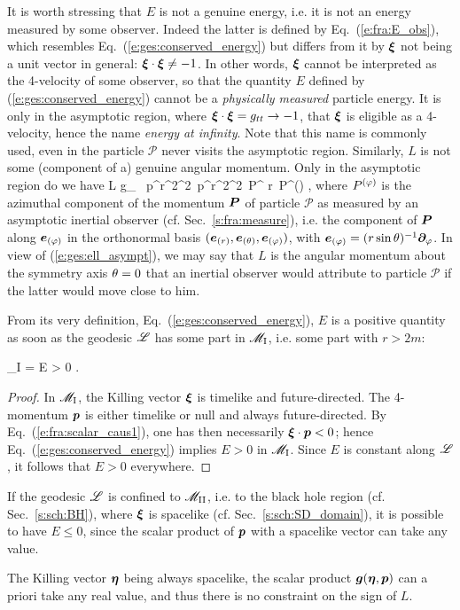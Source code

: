 It is worth stressing that $E$ is not a genuine energy, i.e. it is not
an energy measured by some observer. Indeed the latter is defined by
Eq.~(\ref{e:fra:E_obs}), which resembles Eq.~(\ref{e:ges:conserved_energy})
but differs from it by $\bm{\xi}$ not being a unit vector in general:
$\bm{\xi}\cdot\bm{\xi} \not = -1$. In other words, $\bm{\xi}$ cannot
be interpreted as the 4-velocity of some observer, so that the quantity
$E$ defined by (\ref{e:ges:conserved_energy}) cannot be a \emph{physically measured}
particle energy. It is only in the asymptotic region, where $\bm{\xi}\cdot\bm{\xi} = g_{tt}
\to -1$, that $\bm{\xi}$ is eligible as a 4-velocity, hence the name
\emph{energy at infinity}. Note that this name is commonly used, even in the
particle $\mathscr{P}$ never visits the asymptotic region.
Similarly, $L$ is not some (component of a) genuine angular momentum. Only in the
asymptotic region do we have
\be \label{e:ges:ell_asympt}
    L \simeq g_{\ph\ph} \, p^\ph \simeq r^2\sin^2\ph \, p^\ph \simeq r^2\sin^2\theta \, P^\ph
    \simeq r\sin\th \, P^{(\ph)} ,
\ee
where $P^{(\varphi)}$ is the azimuthal component of the momentum $\bm{P}$ of particle $\mathscr{P}$
as measured by an asymptotic inertial observer (cf. Sec.~\ref{s:fra:measure}), i.e.
the component of $\bm{P}$ along $\bm{e}_{(\varphi)}$ in the orthonormal basis $(\bm{e}_{(r)}, \bm{e}_{(\theta)}, \bm{e}_{(\varphi)})$, with $\bm{e}_{(\varphi)} = (r\sin\theta)^{-1} \bm{\partial}_\varphi$.
In view of (\ref{e:ges:ell_asympt}), we may say that $L$ is the angular momentum
about the symmetry axis $\theta=0$ that an inertial observer would attribute to
particle $\mathscr{P}$ if the latter would move close to him.

From its very definition, Eq.~(\ref{e:ges:conserved_energy}), $E$ is
a positive
quantity as soon as the geodesic $\mathscr{L}$ has some part in $\mathscr{M}_{\rm I}$, i.e.
some part with $r>2m$:
\begin{greybox}
\be \label{e:ges:E_positive_M_I}
    \Li \cap \M_{\rm I} \not= \varnothing \quad \Longrightarrow \quad E > 0 .
\ee
\end{greybox}
\begin{proof}
In $\mathscr{M}_{\rm I}$, the Killing vector $\bm{\xi}$ is timelike and future-directed.
The 4-momentum $\bm{p}$ is either timelike or null and always future-directed.
By Eq.~(\ref{e:fra:scalar_caus1}), one has then necessarily $\bm{\xi}\cdot\bm{p} < 0$; hence Eq.~(\ref{e:ges:conserved_energy})
implies $E > 0$ in $\mathscr{M}_{\rm I}$. Since $E$ is constant along $\mathscr{L}$, it
follows that $E > 0$ everywhere.
\end{proof}
\begin{remark}
If the geodesic $\mathscr{L}$ is confined to $\mathscr{M}_{\rm II}$, i.e. to the black hole
region (cf. Sec.~\ref{s:sch:BH}),
where $\bm{\xi}$ is spacelike (cf. Sec.~\ref{s:sch:SD_domain}),
it is possible to have $E \leq 0$, since the
scalar product of $\bm{p}$ with a spacelike vector can take any value.
\end{remark}
\begin{remark}\label{r:ges:L_any_sign}
The Killing vector $\bm{\eta}$ being always spacelike,
the scalar product $\bm{g}(\bm{\eta},\bm{p})$ can a priori take any real value, and
thus there is no constraint
on the sign of $L$.
\end{remark}


